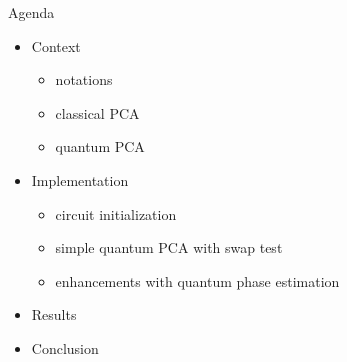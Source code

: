 \begin{frame}{Agenda}
  \begin{minipage}{1.0\textwidth}
    \begin{itemize}
      \item Context
      \begin{itemize}
        \item notations
        \item classical PCA
        \item quantum PCA
      \end{itemize}
      \item Implementation
          \begin{itemize}
            \item circuit initialization
            \item simple quantum PCA with swap test
            \item enhancements with quantum phase estimation
          \end{itemize}
      \item Results
      \item Conclusion
    \end{itemize}
  \end{minipage}
\end{frame}
